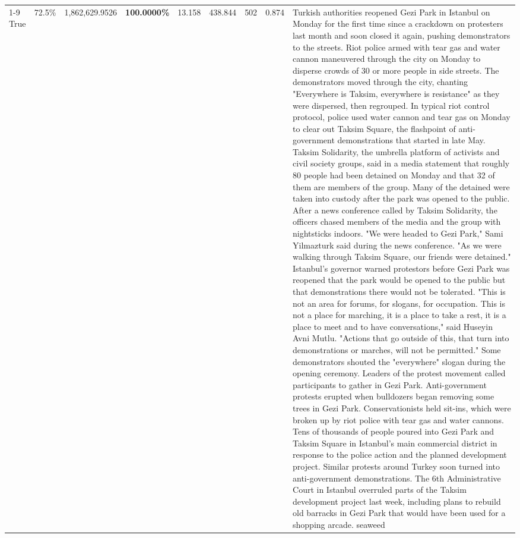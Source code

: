 \begin{table}[H]
\begin{tabular}{lllrlllll}
\cline{1-9}
True & 72.5\% & 1,862,629.9526 & \bfseries \color{red} 100.0000\% & 13.158 & 438.844 & 502 & 0.874 & Turkish authorities reopened Gezi Park in Istanbul on Monday for the first time since a crackdown on protesters last month and soon closed it again, pushing demonstrators to the streets. Riot police armed with tear gas and water cannon maneuvered through the city on Monday to disperse crowds of 30 or more people in side streets. The demonstrators moved through the city, chanting "Everywhere is Taksim, everywhere is resistance" as they were dispersed, then regrouped. In typical riot control protocol, police used water cannon and tear gas on Monday to clear out Taksim Square, the flashpoint of anti-government demonstrations that started in late May. Taksim Solidarity, the umbrella platform of activists and civil society groups, said in a media statement that roughly 80 people had been detained on Monday and that 32 of them are members of the group. Many of the detained were taken into custody after the park was opened to the public. After a news conference called by Taksim Solidarity, the officers chased members of the media and the group with nightsticks indoors. "We were headed to Gezi Park," Sami Yilmazturk said during the news conference. "As we were walking through Taksim Square, our friends were detained." Istanbul's governor warned protestors before Gezi Park was reopened that the park would be opened to the public but that demonstrations there would not be tolerated. "This is not an area for forums, for slogans, for occupation. This is not a place for marching, it is a place to take a rest, it is a place to meet and to have conversations," said Huseyin Avni Mutlu. "Actions that go outside of this, that turn into demonstrations or marches, will not be permitted." Some demonstrators shouted the "everywhere" slogan during the opening ceremony. Leaders of the protest movement called participants to gather in Gezi Park. Anti-government protests erupted when bulldozers began removing some trees in Gezi Park. Conservationists held sit-ins, which were broken up by riot police with tear gas and water cannons. Tens of thousands of people poured into Gezi Park and Taksim Square in Istanbul's main commercial district in response to the police action and the planned development project. Similar protests around Turkey soon turned into anti-government demonstrations. The 6th Administrative Court in Istanbul overruled parts of the Taksim development project last week, including plans to rebuild old barracks in Gezi Park that would have been used for a shopping arcade. seaweed \\

\end{tabular}
\end{table}
